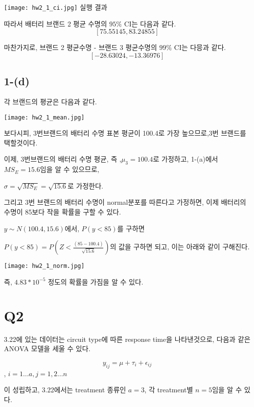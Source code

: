 \documentclass{article}
\begin{document}
\begin{center}
    \texttt{[image: hw2\_1\_ci.jpg]}
실행 결과
\end{center} 

따라서 배터리 브랜드 2 평균 수명의 $95 \%$ CI는 다음과 같다.
$$[75.55145, 83.24855]$$

마찬가지로, 브랜드 2 평균수명 - 브랜드 3 평균수명의 $99 \%$ CI는 다믕과 같다.
$$[-28.63024, -13.36976]$$


\subsection{1-(d)}
각 브랜드의 평균은 다음과 같다.

\begin{center}
    \texttt{[image: hw2\_1\_mean.jpg]}
\end{center} 

보다시피, 3번브랜드의 배터리 수명 표본 평균이 100.4로 가장 높으므로,3번 브랜드를 택할것이다.

이제, 3번브랜드의 배터리 수명 평균, 즉 ,$\mu_3 = 100.4$로 가정하고, 1-(a)에서 $MS_E = 15.6$임을 알 수 있으므로,

$\sigma = \sqrt{MS_E} = \sqrt{15.6}$로 가정한다.

그리고 3번 브랜드의 배터리 수명이 normal분포를 따른다고 가정하면, 이제 배터리의 수명이 85보다 작을 확률을 구할 수 있다.

$y \sim N(100.4 , 15.6)$에서, $P(y < 85)$를 구하면 

$P(y < 85) = P(Z < \frac{(85 - 100.4)}{\sqrt{15.6}})$의 값을 구하면 되고, 이는 아래와 같이 구해진다.

\begin{center}
    \texttt{[image: hw2\_1\_norm.jpg]}
\end{center} 
즉, $4.83 * 10^{-5}$ 정도의 확률을 가짐을 알 수 있다.


  





\section{Q2} 

3.22에 있는 데이터는 circuit type에 따른 response time을 나타낸것으로, 다음과 같은 ANOVA 모델을 세울 수 있다.

$$y_{ij} = \mu + \tau_i + \epsilon_{ij} $$, $i = 1...a, j = 1, 2... n$

이 성립하고, 3.22에서는 treatment 종류인 $ a = 3 $, 각 treatment별 $n = 5$임을 알 수 있다.
\end{document}
